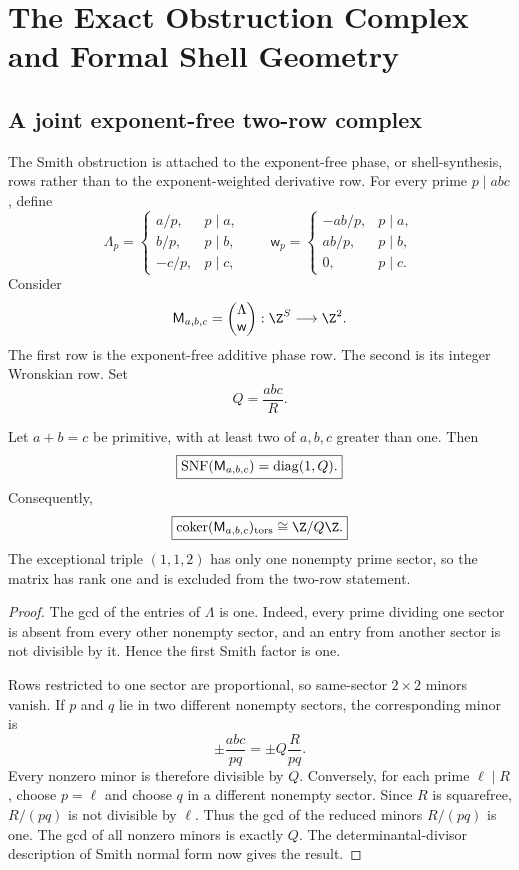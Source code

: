 \clearpage
\section{The Exact Obstruction Complex and Formal Shell Geometry}

\subsection{A joint exponent-free two-row complex}
The Smith obstruction is attached to the exponent-free phase, or shell-synthesis, rows rather than to the exponent-weighted derivative row. For every prime $p\mid abc$, define
\[
 \Lambda_p=
 \begin{cases}
 a/p,&p\mid a,\\
 b/p,&p\mid b,\\
 -c/p,&p\mid c,
 \end{cases}
 \qquad
 \mathsf w_p=
 \begin{cases}
 -ab/p,&p\mid a,\\
 ab/p,&p\mid b,\\
 0,&p\mid c.
 \end{cases}
\]
Consider
\[
 \mathsf M_{a,b,c}
 =
 \begin{pmatrix}
 \Lambda\\
 \mathsf w
 \end{pmatrix}:
 \Z^S\longrightarrow\Z^2.
\]
The first row is the exponent-free additive phase row. The second is its integer Wronskian row. Set
\[
 Q=\frac{abc}{R}.
\]

\begin{theorem}\label{thm:phase-smith}
Let $a+b=c$ be primitive, with at least two of $a,b,c$ greater than one. Then
\[
 \boxed{
 \operatorname{SNF}(\mathsf M_{a,b,c})
 =
 \operatorname{diag}(1,Q).
 }
\]
Consequently,
\[
 \boxed{
 \operatorname{coker}(\mathsf M_{a,b,c})_{\mathrm{tors}}
 \cong
 \Z/Q\Z.
 }
\]
The exceptional triple $(1,1,2)$ has only one nonempty prime sector, so the matrix has rank one and is excluded from the two-row statement.
\end{theorem}

\begin{proof}
The gcd of the entries of $\Lambda$ is one. Indeed, every prime dividing one sector is absent from every other nonempty sector, and an entry from another sector is not divisible by it. Hence the first Smith factor is one.

Rows restricted to one sector are proportional, so same-sector $2\times2$ minors vanish. If $p$ and $q$ lie in two different nonempty sectors, the corresponding minor is
\[
 \pm\frac{abc}{pq}
 =
 \pm Q\frac{R}{pq}.
\]
Every nonzero minor is therefore divisible by $Q$. Conversely, for each prime $\ell\mid R$, choose $p=\ell$ and choose $q$ in a different nonempty sector. Since $R$ is squarefree, $R/(pq)$ is not divisible by $\ell$. Thus the gcd of the reduced minors $R/(pq)$ is one. The gcd of all nonzero minors is exactly $Q$. The determinantal-divisor description of Smith normal form now gives the result.
\end{proof}

